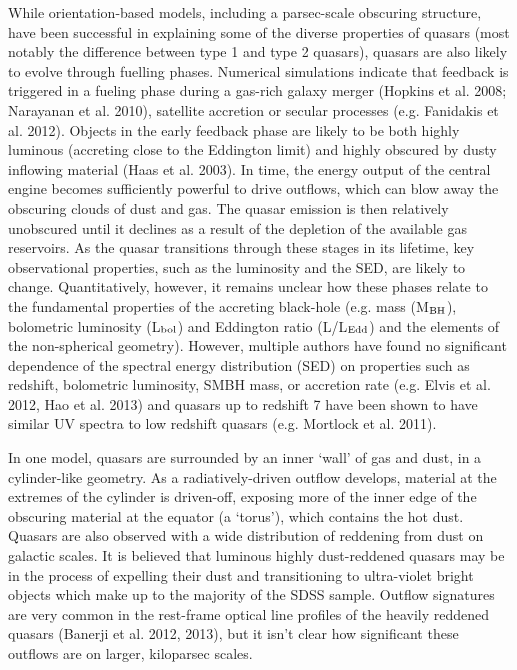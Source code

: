 While orientation-based models, including a parsec-scale obscuring structure, have been successful in explaining some of the diverse properties of quasars (most notably the difference between type 1 and type 2 quasars), quasars are also likely to evolve through fuelling phases. 
Numerical simulations indicate that feedback is triggered in a fueling phase during a gas-rich galaxy merger (Hopkins et al. 2008; Narayanan et al. 2010), satellite accretion or secular processes (e.g. Fanidakis et al. 2012). 
Objects in the early feedback phase are likely to be both highly luminous (accreting close to the Eddington limit) and highly obscured by dusty inflowing material (Haas et al. 2003). 
In time, the energy output of the  central engine becomes sufficiently powerful to drive outflows, which can blow away the obscuring clouds of dust and gas. 
The quasar emission is then relatively unobscured until it declines as a result of the depletion of the available gas reservoirs. 
As the quasar transitions through these stages in its lifetime, key observational properties, such as the luminosity and the SED, are likely to change. 
Quantitatively, however, it remains unclear how these phases relate to the fundamental properties of the accreting black-hole (e.g.  mass (M$_{\rm{BH}}$), bolometric luminosity (L$_{\rm{bol}}$) and Eddington ratio (L/L$_{\rm{Edd}}$) and the elements of the non-spherical geometry). 
However, multiple authors have found no significant dependence of the spectral energy distribution (SED) on properties such as redshift, bolometric luminosity, SMBH mass, or accretion rate (e.g. Elvis et al. 2012, Hao et al. 2013) and quasars up to redshift 7 have been shown to have similar UV spectra to low redshift quasars (e.g. Mortlock et al. 2011). 

In one model, quasars are surrounded by an inner `wall' of gas and dust, in a cylinder-like geometry. 
As a radiatively-driven outflow develops, material at the extremes of the cylinder is driven-off, exposing more of the inner edge of the obscuring material at the equator (a `torus'), which contains the hot dust. 
Quasars are also observed with a wide distribution of reddening from dust on galactic scales. 
It is believed that luminous highly dust-reddened quasars may be in the process of expelling their dust and transitioning to ultra-violet bright objects which make up to the majority of the SDSS sample. 
Outflow signatures are very common in the rest-frame optical \ha line profiles of the heavily reddened quasars (Banerji et al. 2012, 2013), but it isn't clear how significant these outflows are on larger, kiloparsec scales.
